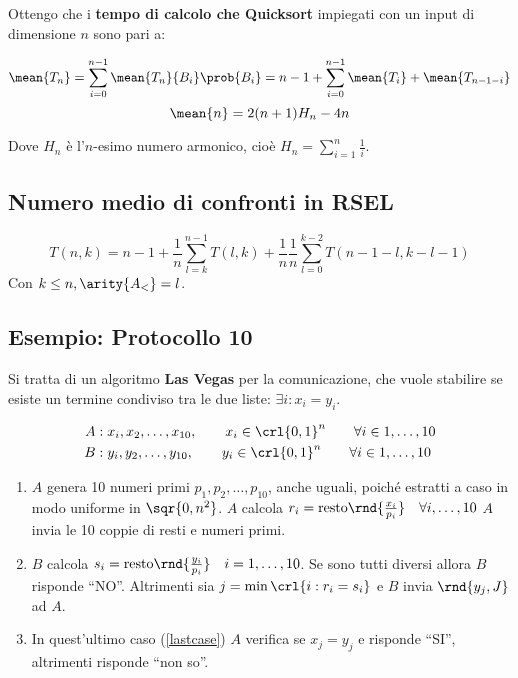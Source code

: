 \documentclass[\main/main.tex]{subfiles}
\begin{document}
Ottengo che i \textbf{tempo di calcolo che Quicksort} impiegati con un input di dimensione \(n\) sono pari a:

\[
	\mean{T_n} = \sum_{i = 0}^{n-1} \mean{T_n}{B_i} \prob{B_i} = n-1 + \sum_{i = 0}^{n-1} \mean{T_i} + \mean{T_{n-1-i}}
\]
\[
	\mean{n} = 2(n+1)H_n - 4n
\]

Dove \(H_n\) è l'\(n\)-esimo numero armonico, cioè \(H_n = \sum_{i=1}^n \frac{1}{i}\).

\subsection{Numero medio di confronti in RSEL}
\[
	T(n,k) = n-1 + \frac{1}{n}\sum_{l=k}^{n-1} T(l,k) + \frac{1}{n} \frac{1}{n}\sum_{l=0}^{k-2} T(n-1-l, k-l-1)
\]
Con \(k\leq n, \arity{A_<} = l\).

\subsection{Esempio: Protocollo 10}
Si tratta di un algoritmo \textbf{Las Vegas} per la comunicazione, che vuole stabilire se esiste un termine condiviso tra le due liste: \(\exists i: x_i = y_i\).

\begin{align*}
	A & : x_i, x_2, \ldots, x_{10}, \qquad x_i \in \crl{0,1}^n \qquad \forall i \in 1, \ldots, 10 \\
	B & : y_i, y_2, \ldots, y_{10}, \qquad y_i \in \crl{0,1}^n \qquad \forall i \in 1, \ldots, 10
\end{align*}

\begin{enumerate}
	\item \(A\) genera 10 numeri primi \(p_1, p_2, \ldots, p_10\), anche uguali, poiché estratti a caso in modo uniforme in \(\sqr{0, n^2}\).
	      \subitem \(A\) calcola \(r_i = \text{resto}\rnd{\frac{x_i}{p_i}} \quad \forall i, \ldots, 10\)
	      \subitem \(A\) invia le 10 coppie di resti e numeri primi.
	\item \(B\) calcola \(s_i = \text{resto}\rnd{\frac{y_i}{p_i}} \quad i = 1, \ldots, 10\).
	      \subitem Se sono tutti diversi allora \(B\) risponde ``NO''.
	      \subitem Altrimenti sia \(j=\min\crl{i: r_i = s_i}\) e \(B\) invia \(\rnd{y_j, J}\) ad \(A\). \label{lastcase}
	\item In quest'ultimo caso (\ref{lastcase}) \(A\) verifica se \(x_j = y_j\) e risponde ``SI'', altrimenti risponde ``non so''.
\end{enumerate}
\end{document}
